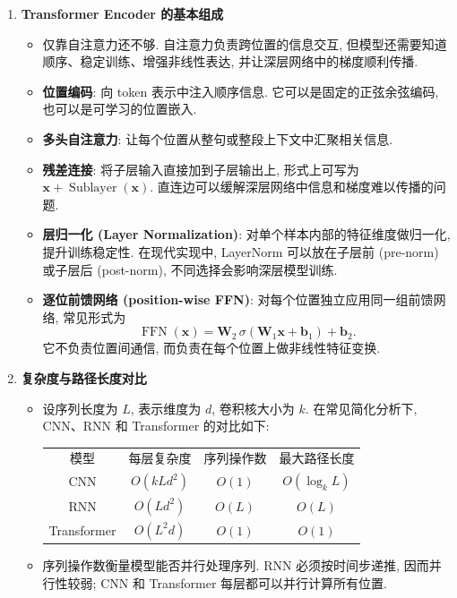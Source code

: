 \documentclass{../nndlcourse}
\begin{document}
\begin{enumerate}
  \item \textbf{Transformer Encoder 的基本组成}
    \begin{itemize}
      \item 仅靠自注意力还不够. 自注意力负责跨位置的信息交互, 但模型还需要知道顺序、稳定训练、增强非线性表达, 并让深层网络中的梯度顺利传播.
      \item \textbf{位置编码}: 向 token 表示中注入顺序信息. 它可以是固定的正弦余弦编码, 也可以是可学习的位置嵌入.
      \item \textbf{多头自注意力}: 让每个位置从整句或整段上下文中汇聚相关信息.
      \item \textbf{残差连接}: 将子层输入直接加到子层输出上, 形式上可写为 $\boldsymbol{x}+\operatorname{Sublayer}(\boldsymbol{x})$. 直连边可以缓解深层网络中信息和梯度难以传播的问题.
      \item \textbf{层归一化 (Layer Normalization)}: 对单个样本内部的特征维度做归一化, 提升训练稳定性. 在现代实现中, LayerNorm 可以放在子层前 (pre-norm) 或子层后 (post-norm), 不同选择会影响深层模型训练.
      \item \textbf{逐位前馈网络 (position-wise FFN)}: 对每个位置独立应用同一组前馈网络, 常见形式为
      \begin{equation*}
        \operatorname{FFN}(\boldsymbol{x})
        =
        \boldsymbol{W}_2\,\sigma(\boldsymbol{W}_1\boldsymbol{x}+\boldsymbol{b}_1)+\boldsymbol{b}_2.
      \end{equation*}
      它不负责位置间通信, 而负责在每个位置上做非线性特征变换.
    \end{itemize}
  \item \textbf{复杂度与路径长度对比}
    \begin{itemize}
      \item 设序列长度为 $L$, 表示维度为 $d$, 卷积核大小为 $k$. 在常见简化分析下, CNN、RNN 和 Transformer 的对比如下:
      \begin{center}
      \begin{tabular}{c c c c}
      模型 & 每层复杂度 & 序列操作数 & 最大路径长度 \\
      CNN & $O(kLd^2)$ & $O(1)$ & $O(\log_k L)$ \\
      RNN & $O(Ld^2)$ & $O(L)$ & $O(L)$ \\
      Transformer & $O(L^2d)$ & $O(1)$ & $O(1)$ \\
      \end{tabular}
      \end{center}
      \item 序列操作数衡量模型能否并行处理序列. RNN 必须按时间步递推, 因而并行性较弱; CNN 和 Transformer 每层都可以并行计算所有位置.

\end{itemize}
\end{enumerate}
\end{document}
